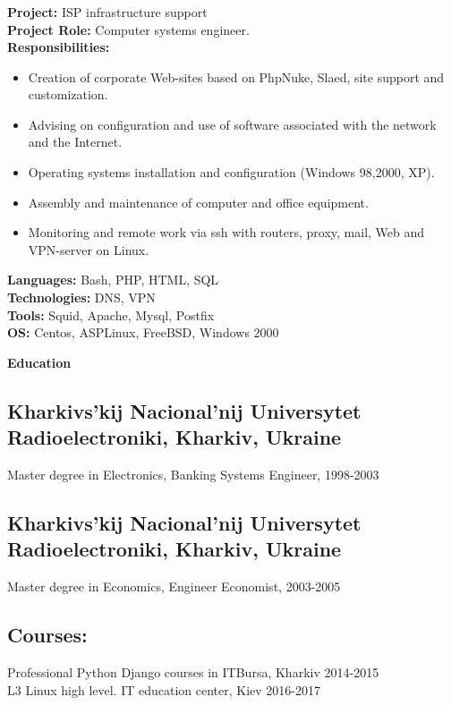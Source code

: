 \documentclass[letterpaper]{article}
\renewcommand{\section}[1]{
  {
    \large \colorbox{my-gray}{
      \begin{minipage}
        {\textwidth-0.175in}
        {\textbf{#1 \vphantom{p\^{E}}}}
      \end{minipage}
    }
  }
}
\begin{document}
\subsubsection{}
\label{sec-2-4-1}
\textbf{Project:} ISP infrastructure support\\
\textbf{Project Role:}  Computer systems engineer.\\
\textbf{Responsibilities:}
\begin{itemize}
\item Creation of corporate Web-sites based on PhpNuke, Slaed, site support and customization.
\item Advising on configuration and use of software associated with the network and the Internet.
\item Operating systems installation and configuration (Windows 98,2000, XP).
\item Assembly and maintenance of computer and office equipment.
\item Monitoring and remote work via ssh with routers, proxy, mail, Web and VPN-server on Linux.
\end{itemize}
\textbf{Languages:} Bash, PHP, HTML, SQL\\
\textbf{Technologies:} DNS, VPN\\
\textbf{Tools:}  Squid, Apache, Mysql, Postfix\\
\textbf{OS:} Centos, ASPLinux, FreeBSD, Windows 2000\\
\section{Education}
\label{sec-4}
\subsection{Kharkivs'kij Nacional'nij Universytet Radioelectroniki, Kharkiv, Ukraine}
\label{sec-4-1}
Master degree in Electronics, Banking Systems Engineer, 1998-2003\\
\subsection{Kharkivs'kij Nacional'nij Universytet Radioelectroniki, Kharkiv, Ukraine}
\label{sec-4-1}
Master degree in Economics, Engineer Economist, 2003-2005\\
\subsection{Courses:}
\label{sec-4-1-2}
Professional Python Django courses in ITBursa, Kharkiv 2014-2015\\
L3 Linux high level. IT education center, Kiev 2016-2017\\
\vspace*{1em plus .6em minus .5em}
\end{document}

